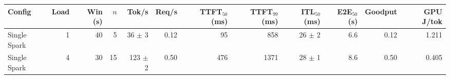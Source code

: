 \begin{tabular}{l r r r r r r r r r r r}
\toprule
Config & Load & Win (s) & $n$ & Tok/s & Req/s & TTFT$_{50}$ (ms) & TTFT$_{99}$ (ms) & ITL$_{50}$ (ms) & E2E$_{50}$ (s) & Goodput & GPU J/tok \\
\midrule
Single Spark & 1 & 40 & 5\rlap{$^\dagger$} & 36 $\pm$ 3 & 0.12 & 95 & 858 & 26 $\pm$ 2 & 6.6 & 0.12 & 1.211 \\
Single Spark & 4 & 30 & 15\rlap{$^\dagger$} & 123 $\pm$ 2 & 0.50 & 476 & 1371 & 28 $\pm$ 1 & 8.6 & 0.50 & 0.405 \\
\bottomrule
\end{tabular}
